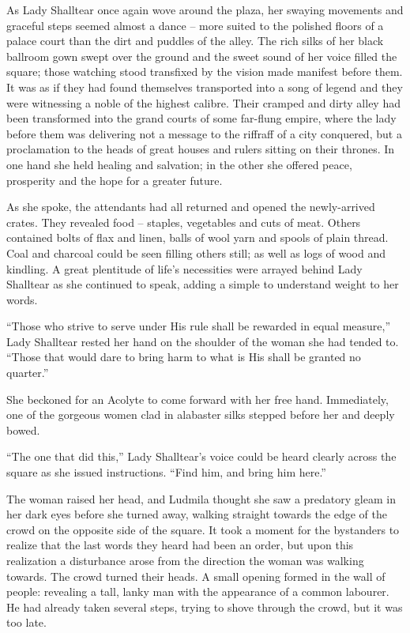  

As Lady Shalltear once again wove around the plaza, her swaying movements and graceful steps seemed almost a dance – more suited to the polished floors of a palace court than the dirt and puddles of the alley. The rich silks of her black ballroom gown swept over the ground and the sweet sound of her voice filled the square; those watching stood transfixed by the vision made manifest before them. It was as if they had found themselves transported into a song of legend and they were witnessing a noble of the highest calibre. Their cramped and dirty alley had been transformed into the grand courts of some far-flung empire, where the lady before them was delivering not a message to the riffraff of a city conquered, but a proclamation to the heads of great houses and rulers sitting on their thrones. In one hand she held healing and salvation; in the other she offered peace, prosperity and the hope for a greater future.

 

As she spoke, the attendants had all returned and opened the newly-arrived crates. They revealed food – staples, vegetables and cuts of meat. Others contained bolts of flax and linen, balls of wool yarn and spools of plain thread. Coal and charcoal could be seen filling others still; as well as logs of wood and kindling. A great plentitude of life's necessities were arrayed behind Lady Shalltear as she continued to speak, adding a simple to understand weight to her words.

 

“Those who strive to serve under His rule shall be rewarded in equal measure,” Lady Shalltear rested her hand on the shoulder of the woman she had tended to. “Those that would dare to bring harm to what is His shall be granted no quarter.”

 

She beckoned for an Acolyte to come forward with her free hand. Immediately, one of the gorgeous women clad in alabaster silks stepped before her and deeply bowed.

 

“The one that did this,” Lady Shalltear's voice could be heard clearly across the square as she issued instructions. “Find him, and bring him here.”

 

The woman raised her head, and Ludmila thought she saw a predatory gleam in her dark eyes before she turned away, walking straight towards the edge of the crowd on the opposite side of the square. It took a moment for the bystanders to realize that the last words they heard had been an order, but upon this realization a disturbance arose from the direction the woman was walking towards. The crowd turned their heads. A small opening formed in the wall of people: revealing a tall, lanky man with the appearance of a common labourer. He had already taken several steps, trying to shove through the crowd, but it was too late.

